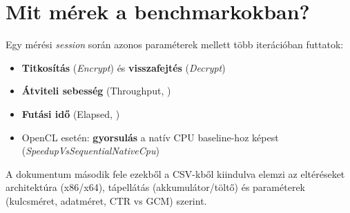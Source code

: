 \section{Mit mérek a benchmarkokban?}

Egy mérési \emph{session} során azonos paraméterek mellett több iterációban futtatok:

\begin{itemize}
  \item \textbf{Titkosítás} (\emph{Encrypt}) és \textbf{visszafejtés} (\emph{Decrypt})
  \item \textbf{Átviteli sebesség} (Throughput, \mbps)
  \item \textbf{Futási idő} (Elapsed, \ms)
  \item OpenCL esetén: \textbf{gyorsulás} a natív CPU baseline-hoz képest (\emph{SpeedupVsSequentialNativeCpu})
\end{itemize}

A dokumentum második fele ezekből a CSV-kből kiindulva elemzi az eltéréseket architektúra (x86/x64),
tápellátás (akkumulátor/töltő) és paraméterek (kulcsméret, adatméret, CTR vs GCM) szerint.

\cleardoublepage
